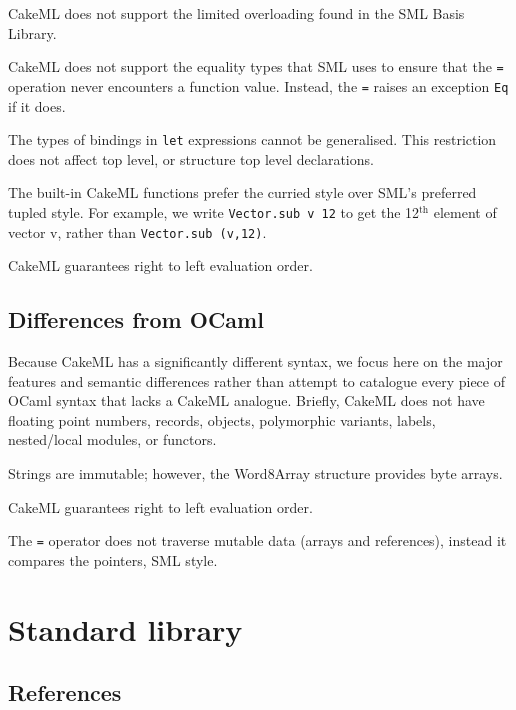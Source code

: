 \documentclass[12pt,a4paper]{book}
\begin{document}
CakeML does not support the limited overloading found in the SML Basis Library.

CakeML does not support the equality types that SML uses to ensure that the \texttt{=} operation never encounters a function value. Instead, the \texttt{=} raises an exception \texttt{Eq} if it does.

The types of bindings in \texttt{let} expressions cannot be generalised. This restriction does not affect top level, or structure top level declarations.

The built-in CakeML functions prefer the curried style over SML's preferred tupled style. For example, we write \texttt{Vector.sub v 12} to get the 12$^\textrm{th}$ element of vector v, rather than \texttt{Vector.sub (v,12)}.

CakeML guarantees right to left evaluation order.

\section{Differences from OCaml}

Because CakeML has a significantly different syntax, we focus here on the major features and semantic differences rather than attempt to catalogue every piece of OCaml syntax that lacks a CakeML analogue. Briefly, CakeML does not have floating point numbers, records, objects, polymorphic variants, labels, nested/local modules, or functors.

Strings are immutable; however, the Word8Array structure provides byte arrays.

CakeML guarantees right to left evaluation order.

The \texttt{=} operator does not traverse mutable data (arrays and references), instead it compares the pointers, SML style.

\chapter{Standard library}
\label{ch:stdlib}



\section{References}
\end{document}
